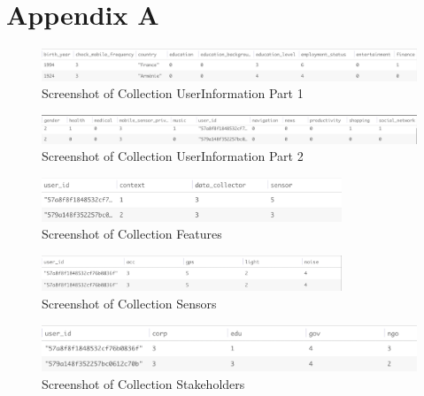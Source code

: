 \chapter{Appendix A}

\begin{figure}[ht!]
\centering
\includegraphics[width=\textwidth,keepaspectratio]{./images/collection_ui_1}
\caption{Screenshot of Collection UserInformation Part 1}
\label{fig:col_ui_1}
\end{figure}

\begin{figure}[ht!]
\centering
\includegraphics[width=\textwidth,keepaspectratio]{./images/collection_ui_2}
\caption{Screenshot of Collection UserInformation Part 2}
\label{fig:col_ui_2}
\end{figure}

\begin{figure}[ht!]
\centering
\includegraphics[width=0.8\textwidth,keepaspectratio]{./images/collection_feature_cat}
\caption{Screenshot of Collection Features}
\label{fig:col_f}
\end{figure}

\begin{figure}[ht!]
\centering
\includegraphics[width=0.8\textwidth,keepaspectratio]{./images/collection_sensors_cat}
\caption{Screenshot of Collection Sensors}
\label{fig:col_s}
\end{figure}

\begin{figure}[ht!]
\centering
\includegraphics[width=\textwidth,keepaspectratio]{./images/collection_dc_cat}
\caption{Screenshot of Collection Stakeholders}
\label{fig:col_ss}
\end{figure}

